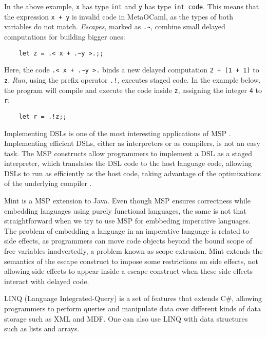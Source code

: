 \documentclass[english]{llncs}
\begin{document}
In the above example, \texttt{x} has type \texttt{int} and \texttt{y} has
type \texttt{int code}.
This means that the expression \texttt{x + y} is invalid code in MetaOCaml,
as the types of both variables do not match. \emph{Escapes}, marked as \texttt{.\~}, combine small delayed computations for building
bigger ones:
\begin{verbatim}
    let z = .< x + .~y >.;;
\end{verbatim}

Here, the code \texttt{.< x + .\~{}y >.} binds a new delayed computation
\texttt{2 + (1 + 1)} to \texttt{z}. \emph{Run}, using the prefix operator \texttt{.!}, executes staged code.
In the example below, the program will compile and execute the code inside
\texttt{z}, assigning the integer \texttt{4} to \texttt{r}:

\begin{verbatim}
    let r = .!z;;
\end{verbatim}

Implementing DSLs is one of the most interesting applications of MSP \cite{Czarnecki2004DSL}.
Implementing efficient DSLs, either as interpreters or as compilers,
is not an easy task.
The MSP constructs allow programmers to implement a DSL as
a staged interpreter, which translates the DSL code to the host language code,
allowing DSLs to run as efficiently as the host code, taking advantage
of the optimizations of the underlying compiler \cite{Taha2004gentle}.

Mint \cite{Westbrook2010Mint} is a MSP extension to Java.
Even though MSP ensures correctness while embedding languages using
purely functional languages, the same is not that straightforward when
we try to use MSP for embbeding imperative languages.
The problem of embedding a language in an imperative language is
related to side effects, as programmers can move code objects
beyond the bound scope of free variables inadvertedly, a problem
known as scope extrusion.
Mint extends the semantics of the escape construct to impose
some restrictions on side effects, not allowing side effects to
appear inside a escape construct when these side effects interact
with delayed code.


LINQ (Language Integrated-Query) \cite{linq} is a set of features that
extends C\#, allowing programmers to perform queries and manipulate data over
different kinds of data storage such as XML and MDF.
One can also use LINQ with data structures such as lists and arrays.
\end{document}
